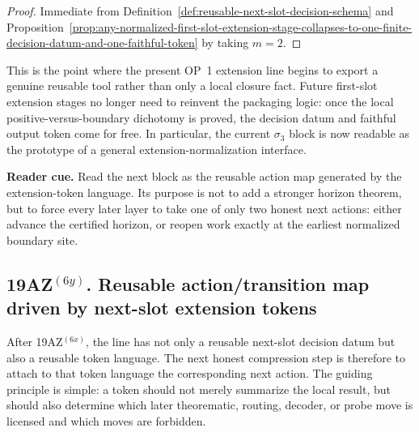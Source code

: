 \begin{proof}
Immediate from Definition~\ref{def:reusable-next-slot-decision-schema} and Proposition~\ref{prop:any-normalized-first-slot-extension-stage-collapses-to-one-finite-decision-datum-and-one-faithful-token} by taking $m=2$.
\end{proof}

\begin{remark}
\label{rem:what-this-schema-now-buys}
This is the point where the present OP~1 extension line begins to export a genuine reusable tool rather than only a local closure fact. Future first-slot extension stages no longer need to reinvent the packaging logic: once the local positive-versus-boundary dichotomy is proved, the decision datum and faithful output token come for free. In particular, the current $\sigma_3$ block is now readable as the prototype of a general extension-normalization interface.
\end{remark}


\noindent\textbf{Reader cue.} Read the next block as the reusable action map generated by the extension-token language. Its purpose is not to add a stronger horizon theorem, but to force every later layer to take one of only two honest next actions: either advance the certified horizon, or reopen work exactly at the earliest normalized boundary site.

\subsection*{19AZ$^{(6y)}$. Reusable action/transition map driven by next-slot extension tokens}
\label{sec:reusable-action-transition-map-driven-by-next-slot-extension-tokens}
After 19AZ$^{(6x)}$, the line has not only a reusable next-slot decision datum but also a reusable token language. The next honest compression step is therefore to attach to that token language the corresponding next action. The guiding principle is simple: a token should not merely summarize the local result, but should also determine which later theorematic, routing, decoder, or probe move is licensed and which moves are forbidden.

